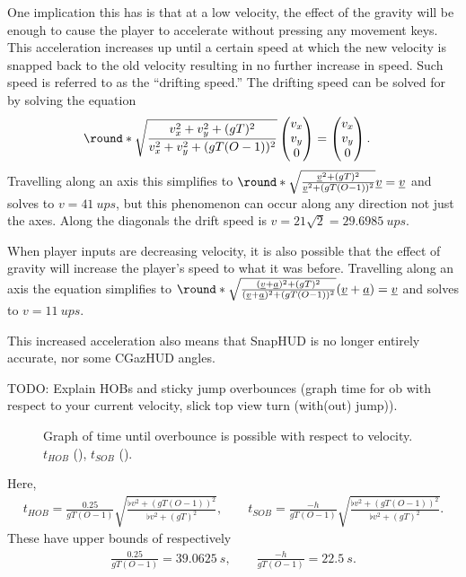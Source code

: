 One implication this has is that at a low velocity, the effect of the gravity will be enough to cause the player to accelerate without pressing any movement keys. This acceleration increases up until a certain speed at which the new velocity is snapped back to the old velocity resulting in no further increase in speed. Such speed is referred to as the ``drifting speed.'' The drifting speed can be solved for by solving the equation
\begin{align*}
\round*{\sqrt{\frac{v_x^2 + v_y^2 + (gT)^2}{v_x^2 + v_y^2 + (gT(O - 1))^2}}\begin{pmatrix}
v_x \\ v_y \\ 0
\end{pmatrix}} &= \begin{pmatrix}
v_x \\ v_y \\ 0
\end{pmatrix}.
\end{align*}
Travelling along an axis this simplifies to $\round*{\sqrt{\frac{\flat{v}^2 + (gT)^2}{\flat{v}^2 + (gT(O - 1))^2}} \flat{v}} = \flat{v}$ and solves to $v = \qty{41}{ups}$, but this phenomenon can occur along any direction not just the axes.
Along the diagonals the drift speed is $v = 21\sqrt{2} = \qty{29.6985}{ups}$.

When player inputs are decreasing velocity, it is also possible that the effect of gravity will increase the player's speed to what it was before.
Travelling along an axis the equation simplifies to $\round*{\sqrt{\frac{(\flat{v} + \flat{a})^2 + (gT)^2}{(\flat{v} + \flat{a})^2 + (gT(O - 1))^2}} (\flat{v} + \flat{a})} = \flat{v}$ and solves to $v = \qty{11}{ups}$.

This increased acceleration also means that SnapHUD is no longer entirely accurate, nor some CGazHUD angles.

TODO: Explain HOBs and sticky jump overbounces (graph time for ob with respect to your current velocity, slick top view turn (with(out) jump)).
\begin{figure}[H]
	\centering
	\setlength\figureheight{4.8cm}
	\setlength\figurewidth{13cm}
	\caption{Graph of time until overbounce is possible with respect to velocity. $t_{HOB}$ (\bluearrow), $t_{SOB}$ (\greenarrow).}
	\label{fig:icy_ob_time}
\end{figure}
Here,
\begin{align*}
t_{HOB} = \frac{0.25}{gT(O - 1)}\sqrt{\frac{\flat{v}^2 + (gT(O - 1))^2}{\flat{v}^2 + (gT)^2}},\qquad t_{SOB} = \frac{-h}{gT(O - 1)}\sqrt{\frac{\flat{v}^2 + (gT(O - 1))^2}{\flat{v}^2 + (gT)^2}}.
\end{align*}
These have upper bounds of respectively
\begin{align*}
\frac{0.25}{gT(O - 1)} = \qty{39.0625}{s},\qquad \frac{-h}{gT(O - 1)} = \qty{22.5}{s}.
\end{align*}


